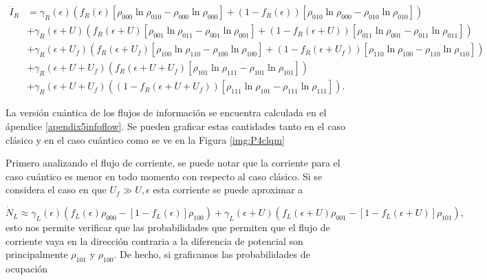 \begin{align*}
 \dot{I}_{R} & =  \gamma_{R}(\epsilon)(f_{R}(\epsilon)[\rho_{000}\ln \rho_{010} - \rho_{000}\ln \rho_{000}] + (1-f_{R}(\epsilon))[\rho_{010}\ln \rho_{000} - \rho_{010}\ln \rho_{010} ] )  \\ 
      & + \gamma_{R}(\epsilon + U)(f_{R}(\epsilon + U)[\rho_{001}\ln \rho_{011} - \rho_{001}\ln \rho_{001}] + (1-f_{R}(\epsilon + U))[\rho_{011}\ln \rho_{001} -\rho_{011}\ln \rho_{011} ]   ) \\  
      & + \gamma_{R}(\epsilon + U_{f})( f_{R}(\epsilon + U_{f})[\rho_{100}\ln \rho_{110} - \rho_{100}\ln \rho_{100} ]  + (1-f_{R}(\epsilon + U_{f}))[\rho_{110}\ln \rho_{100} - \rho_{110}\ln \rho_{110} ] ) \\  
      & + \gamma_{R}(\epsilon + U + U_{f})( f_{R}(\epsilon + U + U_{f})[\rho_{101}\ln \rho_{111}- \rho_{101}\ln \rho_{101}]) \\   
      & + \gamma_{R}(\epsilon + U + U_{f})( (1-f_{R}(\epsilon+U+U_{f}) )[\rho_{111}\ln \rho_{101} - \rho_{111}\ln \rho_{111}]).   
\end{align*}

La versión cuántica de los flujos de información se encuentra calculada en el ápendice \ref{apendix5infoflow}. Se pueden graficar estas cantidades tanto en el caso clásico y en el caso cuántico como se ve en la Figura \ref{img:P4clqm}


Primero analizando el flujo de corriente, se puede notar que la corriente para el caso cuántico es menor en todo momento con respecto al caso clásico. Si se considera el caso en que $U_{f}\gg U,\epsilon$ esta corriente se puede aproximar a  

\begin{equation}
    \dot{N}_{L} \approx  \gamma_{L}(\epsilon)( f_{L}(\epsilon)\rho_{000} - [1-f_{L}(\epsilon)]\rho_{100} ) +  \gamma_{L}(\epsilon+U)(f_{L}(\epsilon+U)\rho_{001} - [1-f_{L}(\epsilon+U)]\rho_{101} )
    ,\label{sec:clqmeq1}
\end{equation}
esto nos permite verificar que las probabilidades que permiten que el flujo de corriente vaya en la dirección contraria a la diferencia de potencial son principalmente $\rho_{101}$ y $\rho_{100}$. De hecho, si graficamos las probabilidades de ocupación

